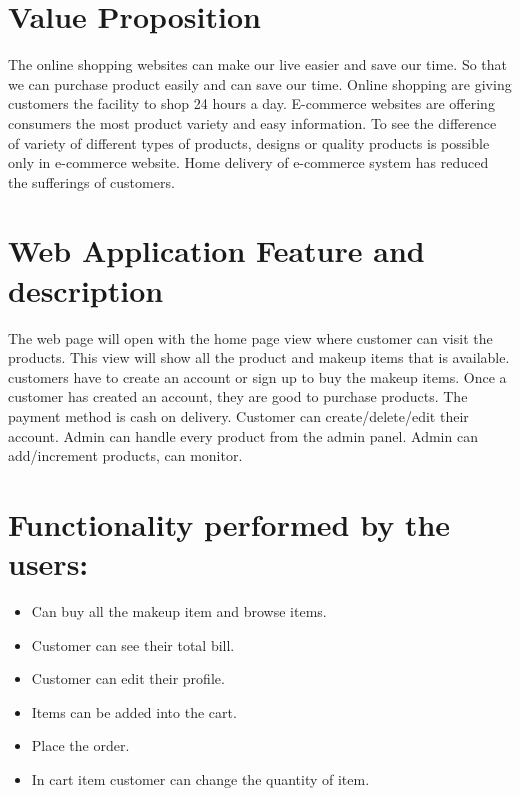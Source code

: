 \documentclass[12pt,letterpaper]{article}
\begin{document}
\hfill \break

\section{Value Proposition}
The online shopping websites can make our live easier and save our time. So that we can purchase product easily and can save our time. Online shopping are giving customers the facility to shop 24 hours a day. E-commerce websites are offering consumers the most product variety and easy information. To see the difference of variety of different types of products, designs or quality products is possible only in e-commerce website. Home delivery of e-commerce system has reduced the sufferings of customers.

\hfill \break

\section{Web Application Feature and description}
The web page will open with the home page view where customer can visit the products. This view will show all the product and makeup items that is available. customers have to create an account or sign up to buy the makeup items. Once a customer has created an account, they are good to purchase products. The payment method is cash on delivery. Customer can create/delete/edit their account. Admin can handle every product from the admin panel. Admin can add/increment products, can monitor. \\

\hfill \break

\section{Functionality performed by the users:}
\begin{itemize}
    \item 	Can buy all the makeup item and browse items.
    \item	Customer can see their total bill.
    \item	Customer can edit their profile.
    \item	Items can be added into the cart.
    \item 	Place the order.
    \item	In cart item customer can change the quantity of item.
\end{itemize}

\hfill \break
\end{document}
